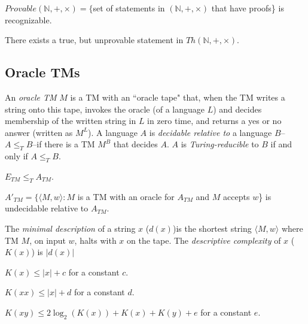 \begin{theorem}
$Provable(\mathbb{N}, +, \times) = \{$set of statements in $(\mathbb{N}, +, \times)$ that have proofs\} is recognizable.
\end{theorem}

\begin{theorem}
There exists a true, but unprovable statement in $Th(\mathbb{N}, +, \times)$.
\end{theorem}

\subsection{Oracle TMs}

\begin{definition}
An \emph{oracle TM} $M$ is a TM with an ``oracle tape" that, when the TM writes a string onto this tape, invokes the oracle (of a language $L$) and decides membership of the written string in $L$ in zero time, and returns a yes or no answer (written as $M^L$). A language $A$ is \emph{decidable relative to} a language $B$--$A \le_T B$--if there is a TM $M^B$ that decides $A$. $A$ is \emph{Turing-reducible} to $B$ if and only if $A \le_T B$.
\end{definition}

\begin{theorem}
$E_{TM} \le_T A_{TM}$.
\end{theorem}

\begin{theorem}
$A'_{TM} = \{\langle M, w\rangle : M$ is a TM with an oracle for $A_{TM}$ and $M$ accepts $w$\} is undecidable relative to $A_{TM}$.
\end{theorem}

\begin{definition}
The \emph{minimal description} of a string $x$ ($d(x)$)is the shortest string $\langle M, w\rangle$ where TM $M$, on input $w$, halts with $x$ on the tape. The \emph{descriptive complexity} of $x$ ($K(x)$) is $|d(x)|$
\end{definition}

\begin{theorem}
$K(x) \le |x| + c$ for a constant $c$.
\end{theorem}

\begin{theorem}
$K(xx) \le |x| + d$ for a constant $d$. 
\end{theorem}

\begin{theorem}
$K(xy) \le 2\log_2(K(x)) + K(x) + K(y) + e$ for a constant $e$.
\end{theorem}

